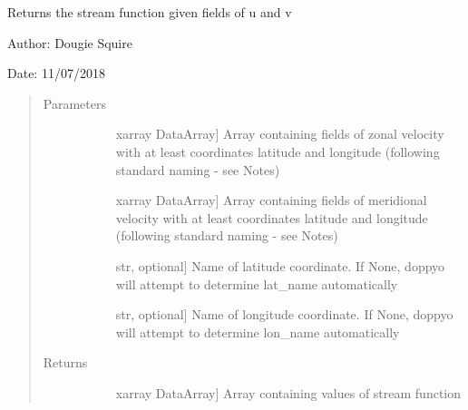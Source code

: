 \documentclass[letterpaper,10pt,english]{sphinxmanual}
\begin{document}

\begin{fulllineitems}
\label{\detokenize{diagnostic_doc:diagnostic.stream_function}}
Returns the stream function given fields of u and v

\begin{DUlineblock}{0em}
\item[] Author: Dougie Squire
\item[] Date: 11/07/2018
\end{DUlineblock}
\begin{quote}\begin{description}
\item[{Parameters}] \leavevmode\begin{description}
\item[{}] \leavevmode{[}xarray DataArray{]}
Array containing fields of zonal velocity with at least coordinates latitude and longitude                     (following standard naming - see Notes)

\item[{}] \leavevmode{[}xarray DataArray{]}
Array containing fields of meridional velocity with at least coordinates latitude and                     longitude (following standard naming - see Notes)

\item[{}] \leavevmode{[}str, optional{]}
Name of latitude coordinate. If None, doppyo will attempt to determine lat\_name                     automatically

\item[{}] \leavevmode{[}str, optional{]}
Name of longitude coordinate. If None, doppyo will attempt to determine lon\_name                     automatically

\end{description}

\item[{Returns}] \leavevmode\begin{description}
\item[{}] \leavevmode{[}xarray DataArray{]}
Array containing values of stream function


\end{description}
\end{description}
\end{quote}
\end{fulllineitems}
\end{document}
